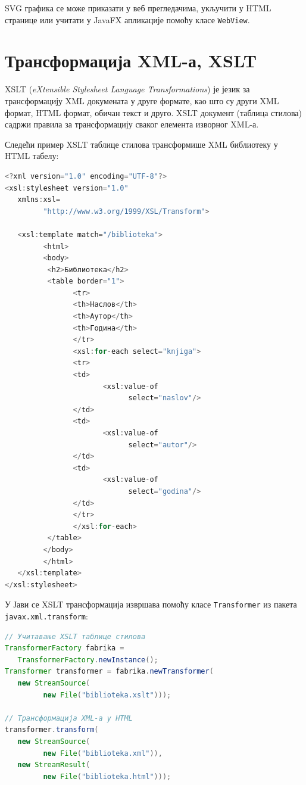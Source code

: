 SVG графика се може приказати у веб прегледачима, укључити у HTML странице или учитати у JavaFX апликације помоћу класе \texttt{WebView}.


\section{Трансформација XML-а, XSLT}

XSLT (\textit{eXtensible Stylesheet Language Transformations}) је језик за трансформацију XML докумената у друге формате, као што су други XML формат, HTML формат, обичан текст и друго. XSLT документ (таблица стилова) садржи правила за трансформацију сваког елемента изворног XML-а.

Следећи пример XSLT таблице стилова трансформише XML библиотеку у HTML табелу:


\begin{lstlisting}[language=Java]
<?xml version="1.0" encoding="UTF-8"?>
<xsl:stylesheet version="1.0"
   xmlns:xsl=
         "http://www.w3.org/1999/XSL/Transform">
 
   <xsl:template match="/biblioteka">
         <html>
         <body>
          <h2>Библиотека</h2>
          <table border="1">
                <tr>
                <th>Наслов</th>
                <th>Аутор</th>
                <th>Година</th>
                </tr>
                <xsl:for-each select="knjiga">
                <tr>
                <td>
                       <xsl:value-of
                             select="naslov"/>
                </td>
                <td>
                       <xsl:value-of
                             select="autor"/>
                </td>
                <td>
                       <xsl:value-of
                             select="godina"/>
                </td>
                </tr>
                </xsl:for-each>
          </table>
         </body>
         </html>
   </xsl:template>
</xsl:stylesheet>
\end{lstlisting}


У Јави се XSLT трансформација извршава помоћу класе \texttt{Transformer} из пакета \texttt{javax.xml.transform}:


\begin{lstlisting}[language=Java]
// Учитавање XSLT таблице стилова
TransformerFactory fabrika =
   TransformerFactory.newInstance();
Transformer transformer = fabrika.newTransformer(
   new StreamSource(
         new File("biblioteka.xslt")));
 
// Трансформација XML-а у HTML
transformer.transform(
   new StreamSource(
         new File("biblioteka.xml")),
   new StreamResult(
         new File("biblioteka.html")));
\end{lstlisting}


